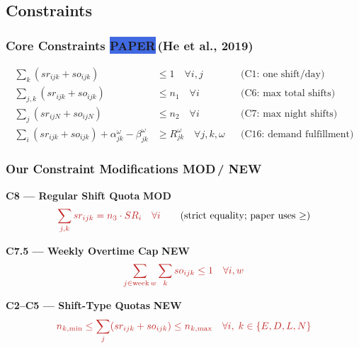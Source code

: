 \documentclass[12pt,a4paper]{article}
\newcommand{\newbadge}{\colorbox{accentgreen}{\tiny\color{white}\textbf{NEW}}\,}
\newcommand{\modbadge}{\colorbox{accentorange}{\tiny\color{white}\textbf{MOD}}\,}
\newcommand{\frombadge}{\colorbox{royalblue}{\tiny\color{white}\textbf{PAPER}}\,}
\begin{document}
\newpage
\subsection{Constraints}

\subsubsection{Core Constraints \frombadge (He et al., 2019)}

\begin{align}
  \sum_k (sr_{ijk}+so_{ijk}) &\leq 1 \quad \forall i,j
    && \text{(C1: one shift/day)}\\
  \sum_{j,k}(sr_{ijk}+so_{ijk}) &\leq n_1 \quad \forall i
    && \text{(C6: max total shifts)}\\
  \sum_j(sr_{ijN}+so_{ijN}) &\leq n_2 \quad \forall i
    && \text{(C7: max night shifts)}\\
  \sum_i(sr_{ijk}+so_{ijk})+\alpha_{jk}^{\omega}-\beta_{jk}^{\omega}
    &\geq R_{jk}^{\omega} \quad \forall j,k,\omega
    && \text{(C16: demand fulfillment)}
\end{align}

\subsubsection{Our Constraint Modifications \modbadge / \newbadge}

\begin{eqbox}
\textbf{C8 — Regular Shift Quota} \modbadge
\begin{equation}
  \textcolor{accentred}{\sum_{j,k} sr_{ijk} = n_3 \cdot SR_i \quad \forall i}
  \qquad\text{(strict equality; paper uses $\geq$)}
\end{equation}
\end{eqbox}

\vspace{6pt}
\begin{eqbox}
\textbf{C7.5 — Weekly Overtime Cap} \newbadge
\begin{equation}
  \textcolor{accentred}{\sum_{j \in \text{week}\,w}\sum_k so_{ijk} \leq 1 \quad \forall i,w}
\end{equation}
\end{eqbox}

\vspace{6pt}
\begin{eqbox}
\textbf{C2–C5 — Shift-Type Quotas} \newbadge
\begin{equation}
  \textcolor{accentred}{
    n_{k,\min} \leq \sum_j(sr_{ijk}+so_{ijk}) \leq n_{k,\max}
    \quad \forall i,\; k \in \{E,D,L,N\}
  }
\end{equation}
\end{eqbox}
\end{document}
